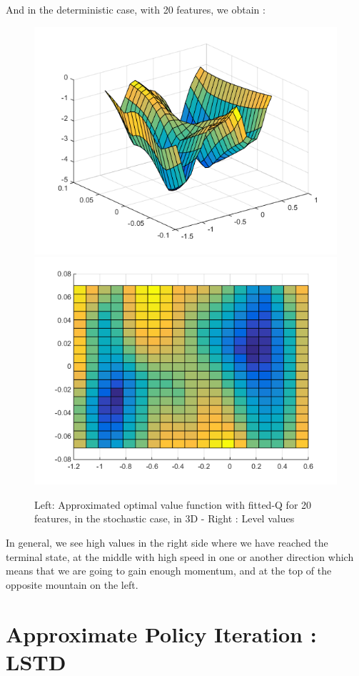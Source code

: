 \documentclass[a4paper, 12pt]{article}
\begin{document}
And in the deterministic case, with 20 features, we obtain :
\begin{figure}[H]
	\centering
	\noindent\includegraphics[scale=0.3]{fittedQ-5ep-5000draws-stochastic.png}
	\noindent\includegraphics[scale=0.3]{fittedQ-5ep-5000draws-stochastic-levels.png}
	\caption{Left: Approximated optimal value function with fitted-Q for 20 features, in the stochastic case, in 3D - Right : Level values}
\end{figure}

In general, we see high values in the right side where we have reached the terminal state, at the middle with high speed in one or another direction which means that we are going to gain enough momentum, and at the top of the opposite mountain on the left.

\section{Approximate Policy Iteration : LSTD}
\end{document}
